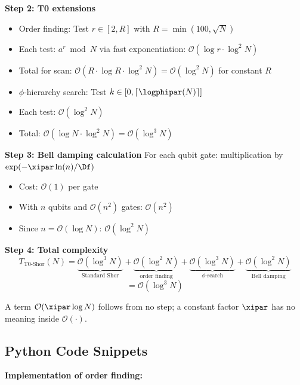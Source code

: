 \textbf{Step 2: T0 extensions}
\begin{itemize}
	\item Order finding: Test $r \in [2, R]$ with $R = \min(100, \sqrt{N})$
	\item Each test: $a^r \bmod N$ via fast exponentiation: $\mathcal{O}(\log r \cdot \log^2 N)$
	\item Total for scan: $\mathcal{O}(R \cdot \log R \cdot \log^2 N) = \mathcal{O}(\log^2 N)$ for constant $R$
	\item $\phi$-hierarchy search: Test $k \in [0, \lceil \logphipar(N) \rceil]$
	\item Each test: $\mathcal{O}(\log^2 N)$
	\item Total: $\mathcal{O}(\log N \cdot \log^2 N) = \mathcal{O}(\log^3 N)$
\end{itemize}

\textbf{Step 3: Bell damping calculation}
For each qubit gate: multiplication by $\exp(-\xipar \ln(n)/\Df)$
\begin{itemize}
	\item Cost: $\mathcal{O}(1)$ per gate
	\item With $n$ qubits and $\mathcal{O}(n^2)$ gates: $\mathcal{O}(n^2)$
	\item Since $n = \mathcal{O}(\log N)$: $\mathcal{O}(\log^2 N)$
\end{itemize}

\textbf{Step 4: Total complexity}
\[
T_{\text{T0-Shor}}(N) = \underbrace{\mathcal{O}(\log^3 N)}_{\text{Standard Shor}} 
+ \underbrace{\mathcal{O}(\log^2 N)}_{\text{order finding}} 
+ \underbrace{\mathcal{O}(\log^3 N)}_{\phi\text{-search}} 
+ \underbrace{\mathcal{O}(\log^2 N)}_{\text{Bell damping}}
\]
\[
= \mathcal{O}(\log^3 N)
\]

A term $\mathcal{O}(\xipar\log N)$ follows from no step; a constant factor $\xipar$ has no meaning inside $\mathcal{O}(\cdot)$.

\subsection{Python Code Snippets}
\label{app:code}

\textbf{Implementation of order finding:}


